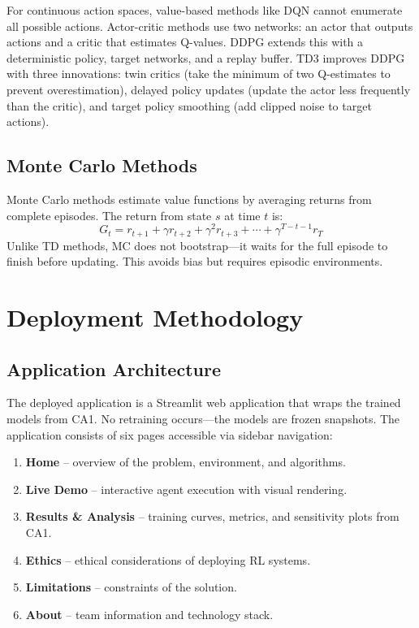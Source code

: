 \documentclass[11pt,a4paper]{article}
\begin{document}
For continuous action spaces, value-based methods like DQN cannot enumerate all possible actions. Actor-critic methods use two networks: an actor that outputs actions and a critic that estimates Q-values. DDPG extends this with a deterministic policy, target networks, and a replay buffer. TD3 improves DDPG with three innovations: twin critics (take the minimum of two Q-estimates to prevent overestimation), delayed policy updates (update the actor less frequently than the critic), and target policy smoothing (add clipped noise to target actions).

\subsection{Monte Carlo Methods}

Monte Carlo methods estimate value functions by averaging returns from complete episodes. The return from state $s$ at time $t$ is:
\begin{equation}
G_t = r_{t+1} + \gamma r_{t+2} + \gamma^2 r_{t+3} + \cdots + \gamma^{T-t-1} r_T
\end{equation}
Unlike TD methods, MC does not bootstrap---it waits for the full episode to finish before updating. This avoids bias but requires episodic environments.

\section{Deployment Methodology}

\subsection{Application Architecture}

The deployed application is a Streamlit web application that wraps the trained models from CA1. No retraining occurs---the models are frozen snapshots. The application consists of six pages accessible via sidebar navigation:

\begin{enumerate}
    \item \textbf{Home} -- overview of the problem, environment, and algorithms.
    \item \textbf{Live Demo} -- interactive agent execution with visual rendering.
    \item \textbf{Results \& Analysis} -- training curves, metrics, and sensitivity plots from CA1.
    \item \textbf{Ethics} -- ethical considerations of deploying RL systems.
    \item \textbf{Limitations} -- constraints of the solution.
    \item \textbf{About} -- team information and technology stack.
\end{enumerate}
\end{document}
